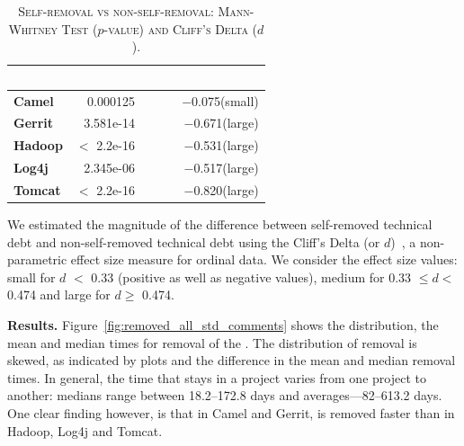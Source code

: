 \begin{table}[t]
	\begin{center}
		\caption{\textsc{Self-removal vs non-self-removal: Mann-Whitney Test ($p$-value) and Cliff's Delta ($d$)}.}
		\label{tbl:statistic}
		\begin{tabular}{l| rrr}
			\toprule
			\textbf{\thead{Project}} & \textbf{\thead{$p$-value}}&~~~ & \textbf{\thead{$d$}}\\ 
			\midrule
			\textbf{Camel }   &  0.000125& ~~~ &  $-$0.075(small)\\  
			\textbf{Gerrit}   &  3.581e-14& ~~~ &  $-$0.671(large)\\  
			\textbf{Hadoop}   &  $<$ 2.2e-16& ~~~ &  $-$0.531(large)\\  
			\textbf{Log4j}   &  2.345e-06 & ~~~ &  $-$0.517(large)\\  
			\textbf{Tomcat}   &  $<$ 2.2e-16  & ~~~ &  $-$0.820(large)\\  
			\bottomrule
		\end{tabular}
	\end{center} 
	\vspace{-0.1in}   
\end{table}




We estimated the magnitude of the difference between self-removed technical debt and non-self-removed technical debt using the Cliff's Delta (or $d$)~\cite{grissom2005effect}, a non-parametric effect size measure for ordinal data. We consider the effect size values: small for $d$ $<$ 0.33 (positive as well as negative values), medium for 0.33  $\leq d<$ 0.474 and large for $d \geq$ 0.474.

\noindent\textbf{Results.} Figure~\ref{fig:removed_all_std_comments} shows the distribution, the mean and median times for removal of the \SATD. The distribution of \SATD removal is skewed, as indicated by plots and the difference in the mean and median removal times. In general, the time that \SATD stays in a project  varies from one project to another: medians range between 18.2--172.8 days and averages---82--613.2 days. One clear finding however, is that in Camel and Gerrit, \SATD is removed faster than in Hadoop, Log4j and Tomcat.


